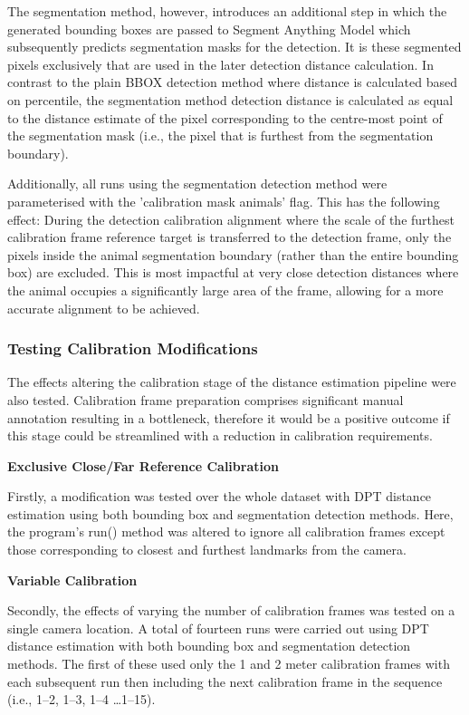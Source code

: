 The segmentation method, however, introduces an additional step in which the generated bounding
boxes are passed to Segment Anything Model which subsequently predicts segmentation masks for
the detection.
It is these segmented pixels exclusively that are used in the later detection distance calculation.
In contrast to the plain BBOX detection method where distance is calculated based on
percentile, the segmentation method detection distance is calculated as equal to the distance
estimate of the pixel corresponding to the centre-most point of the segmentation mask (i.e., the pixel
that is furthest from the segmentation boundary).

Additionally, all runs using the segmentation detection method were parameterised with the
'calibration mask animals' flag.
This has the following effect:
During the detection calibration alignment where the scale of the furthest calibration frame reference
target is transferred to the detection frame, only the pixels inside the animal segmentation boundary
(rather than the entire bounding box) are excluded.
This is most impactful at very close detection distances where the animal occupies a significantly
large area of the frame, allowing for a more accurate alignment to be achieved.

\clearpage

\subsubsection{Testing Calibration Modifications}

The effects altering the calibration stage of the distance estimation pipeline were also tested.
Calibration frame preparation comprises significant manual annotation resulting in a bottleneck,
therefore it would be a positive outcome if this stage could be streamlined with a reduction in
calibration requirements.

\vspace{5mm}
\textbf{Exclusive Close/Far Reference Calibration}

Firstly, a modification was tested over the whole dataset with DPT distance estimation using both
bounding box and segmentation detection methods.
Here, the program's run() method was altered to ignore all calibration frames except those corresponding
to closest and furthest landmarks from the camera.

\vspace{5mm}
\textbf{Variable Calibration}

Secondly, the effects of varying the number of calibration frames was tested on a single camera
location.
A total of fourteen runs were carried out using DPT distance estimation with both bounding box
and segmentation detection methods.
The first of these used only the 1 and 2 meter calibration frames with each subsequent run then including
the next calibration frame in the sequence (i.e., 1–2, 1–3, 1–4 \ldots 1–15).
